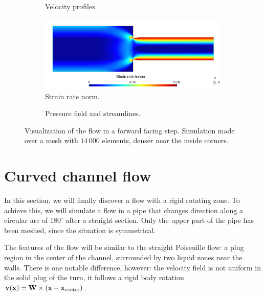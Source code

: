 \documentclass[11 pt]{report}
\begin{document}
\begin{figure}
    \centering
    \begin{subfigure}[t]{\textwidth}
        
        \caption{Velocity profiles.}
        \label{fig:sharpNeckV}
    \end{subfigure}
    \begin{subfigure}[t]{\textwidth}
        \includegraphics[width=\textwidth]{../figures/neck_sharp_strain.pdf}
        \caption{Strain rate norm.}
        \label{fig:sharpNeckS}
    \end{subfigure}
    \begin{subfigure}[t]{\textwidth}
        
        \caption{Pressure field and streamlines.}
        \label{fig:sharpNeckP}
    \end{subfigure}
    \caption{Visualization of the flow in a forward facing step. Simulation made over a mesh with $14\,000$ elements, denser near the inside corners.}
    \label{fig:sharpNeck}
\end{figure}


\section{Curved channel flow}
In this section, we will finally discover a flow with a rigid rotating zone. To achieve this, we will simulate a flow in a pipe that changes direction along a circular arc of $180^\circ$ after a straight section. Only the upper part of the pipe has been meshed, since the situation is symmetrical.

The features of the flow will be similar to the straight Poiseuille flow: a plug region in the center of the channel, surrounded by two liquid zones near the walls. There is one notable difference, however: the velocity field is not uniform in the solid plug of the turn, it follows a rigid body rotation $\mathbf{v}(\mathbf{x}) = \mathbf{W} \times (\mathbf{x} - \mathbf{x}_{\text{center}})$.
\end{document}
